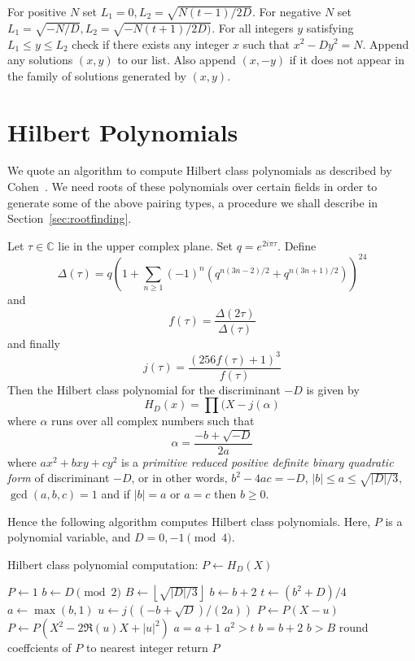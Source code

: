 For positive $N$ set $L_1=0, L_2 =\sqrt{N(t-1)/2D}$. For negative $N$
set $L_1 = \sqrt{-N/D}, L_2=\sqrt{-N(t+1)/2D)}$. For all integers $y$
satisfying $L_1\le y \le L_2$ check if there exists any integer $x$ such that
$x^2 - Dy^2 = N$.
Append any solutions $(x,y)$ to our list. Also append $(x,-y)$ if
it does not appear in the family of solutions generated by $(x, y)$.

\section {Hilbert Polynomials}

We quote an algorithm to compute Hilbert class
polynomials as described by Cohen~\cite[section 7.6.2]{1993-cohen}.
We need roots of these polynomials over certain fields in order to generate
some of the above pairing types, a procedure we shall describe in
Section~\ref{sec:rootfinding}.

Let $\tau \in \mathbb{C}$ lie in the upper complex plane.
Set $q = e^{2 i \pi \tau}$. Define
\[
\Delta(\tau) = q\left(1+\sum_{n\ge1}(-1)^n
\left({q^{n(3n-2)/2} + q^{n(3n+1)/2}}\right)\right)^{24}
\]
and
\[
f(\tau) = \frac{\Delta(2\tau)}{\Delta(\tau)}
\]
and finally
\[
j(\tau) = \frac{(256 f(\tau) + 1)^3}{f(\tau)}
\]
Then the Hilbert class polynomial for the discriminant $-D$ is
given by
\[ H_D(x) = \prod (X - j(\alpha) \]
where $\alpha$ runs over all complex numbers such that
\[ \alpha = \frac{-b+\sqrt{-D}}{2a} \]
where $ax^2 + bxy + cy^2$ is a \emph{primitive reduced positive definite
binary quadratic form} of discriminant $-D$, or in other words,
$b^2 - 4ac = -D$, $|b| \le a \le \sqrt{|D|/3}$, $\gcd(a,b,c)=1$ and
if $|b| = a$ or $a=c$ then $b\ge0$.

Hence the following algorithm computes Hilbert class polynomials.
Here, $P$ is a polynomial variable, and $D = 0, -1 \pmod 4$.

\begin{algorithm}
\caption {Hilbert class polynomial computation: $P \gets H_D(X)$}
\begin{algorithmic}[1]
\STATE $P\gets 1$
\STATE $b\gets D \pmod 2$
\STATE $B\gets \left\lfloor\sqrt{|D|/3}\right\rfloor$
\REPEAT
    \STATE $b\gets b+2$
    \STATE $t\gets (b^2+D)/4$
    \STATE $a\gets \max(b,1)$
    \REPEAT
	    \STATE $u\gets j((-b+\sqrt{D})/(2a))$
		\STATE $P \gets P(X-u)$
	    \ELSE
		\STATE $P \gets P(X^2 - 2\Re(u)X+|u|^2)$
	    \ENDIF
	\ENDIF
	\STATE $a=a+1$
    \UNTIL $a^2>t$
    \STATE $b=b+2$
\UNTIL $b>B$
\STATE round coeffcients of $P$ to nearest integer
\STATE return $P$
\end{algorithmic}
\end{algorithm}


